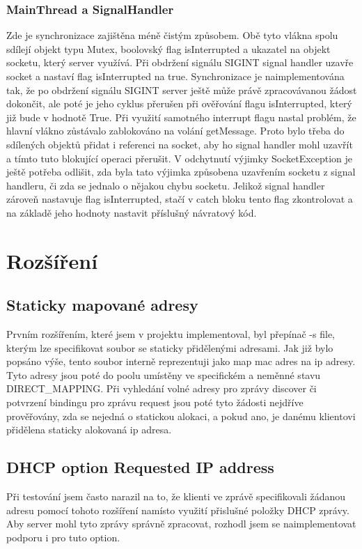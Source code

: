 \documentclass[12pt,a4paper]{report}
\begin{document}
\subsection*{MainThread a SignalHandler}
Zde je synchronizace zajištěna méně čistým způsobem. Obě tyto vlákna spolu sdílejí objekt typu Mutex, boolovský flag isInterrupted a ukazatel na objekt socketu, který server využívá. Při obdržení signálu SIGINT signal handler uzavře socket a nastaví flag isInterrupted na true. Synchronizace je naimplementována tak, že po obdržení signálu SIGINT server ještě může právě zpracovávanou žádost dokončit, ale poté je jeho cyklus přerušen při ověřování flagu isInterrupted, který již bude v hodnotě True. Při využití samotného interrupt flagu nastal problém, že hlavní vlákno zůstávalo zablokováno na volání getMessage. Proto bylo třeba do sdílených objektů přidat i referenci na socket, aby ho signal handler mohl uzavřít a tímto tuto blokující operaci přerušit. V odchytnutí výjimky SocketException je ještě potřeba odlišit, zda byla tato výjimka způsobena uzavřením socketu z signal handleru, či zda se jednalo o nějakou chybu socketu. Jelikož signal handler zároveň nastavuje flag isInterrupted, stačí v catch bloku tento flag zkontrolovat a na základě jeho hodnoty nastavit příslušný návratový kód. 
\chapter{Rozšíření}
\section{Staticky mapované adresy}
Prvním rozšířením, které jsem v projektu implementoval, byl přepínač -s file, kterým lze specifikovat soubor se staticky přidělenými adresami. Jak již bylo popsáno výše, tento soubor interně reprezentuji jako map mac adres na ip adresy. Tyto adresy jsou poté do poolu umístěny ve specifickém a neměnné stavu DIRECT\_MAPPING. Při vyhledání volné adresy pro zprávy discover či potvrzení bindingu pro zprávu request jsou poté tyto žádosti nejdříve prověřovány, zda se nejedná o statickou alokaci, a pokud ano, je danému klientovi přidělena staticky alokovaná ip adresa.
\section{DHCP option Requested IP address}
Při testování jsem často narazil na to, že klienti ve zprávě specifikovali žádanou adresu pomocí tohoto rozšíření namísto využití přislušné položky DHCP zprávy. Aby server mohl tyto zprávy správně zpracovat, rozhodl jsem se naimplementovat podporu i pro tuto option.
\end{document}
